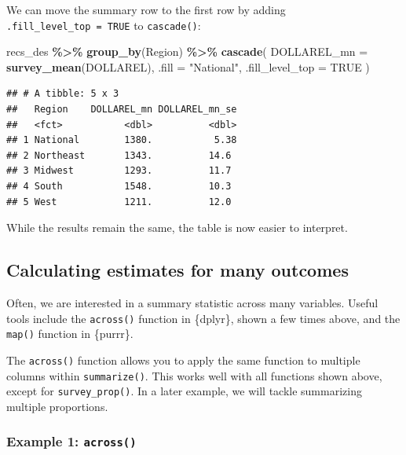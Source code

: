 \documentclass[
]{krantz}
\makeatletter
\newenvironment{Shaded}{\begin{snugshade}}{\end{snugshade}}
\newcommand{\AttributeTok}[1]{\textcolor[rgb]{0.27,0.27,0.27}{#1}}
\newcommand{\ConstantTok}[1]{\textcolor[rgb]{0.37,0.37,0.37}{#1}}
\newcommand{\FunctionTok}[1]{\textcolor[rgb]{0.27,0.27,0.27}{\textbf{#1}}}
\newcommand{\NormalTok}[1]{#1}
\newcommand{\SpecialCharTok}[1]{\textcolor[rgb]{0.43,0.43,0.43}{\textbf{#1}}}
\newcommand{\StringTok}[1]{\textcolor[rgb]{0.5,0.5,0.5}{#1}}
\newenvironment{kframe}{%
\medskip{}
\setlength{\fboxsep}{.8em}
 \def\at@end@of@kframe{}%
 \ifinner\ifhmode%
  \def\at@end@of@kframe{\end{minipage}}%
  \begin{minipage}{\columnwidth}%
 \fi\fi%
 \def\FrameCommand##1{\hskip\@totalleftmargin \hskip-\fboxsep
 \colorbox{shadecolor}{##1}\hskip-\fboxsep
     \hskip-\linewidth \hskip-\@totalleftmargin \hskip\columnwidth}%
 \MakeFramed {\advance\hsize-\width
   \@totalleftmargin\z@ \linewidth\hsize
   \@setminipage}}%
 {\par\unskip\endMakeFramed%
 \at@end@of@kframe}
\renewenvironment{Shaded}{\begin{kframe}}{\end{kframe}}
\makeatother
\begin{document}
We can move the summary row to the first row by adding \texttt{.fill\_level\_top\ =\ TRUE} to \texttt{cascade()}:

\begin{Shaded}
\begin{Highlighting}[]
\NormalTok{recs\_des }\SpecialCharTok{\%\textgreater{}\%}
  \FunctionTok{group\_by}\NormalTok{(Region) }\SpecialCharTok{\%\textgreater{}\%}
  \FunctionTok{cascade}\NormalTok{(}
    \AttributeTok{DOLLAREL\_mn =} \FunctionTok{survey\_mean}\NormalTok{(DOLLAREL),}
    \AttributeTok{.fill =} \StringTok{"National"}\NormalTok{,}
    \AttributeTok{.fill\_level\_top =} \ConstantTok{TRUE}
\NormalTok{  )}
\end{Highlighting}
\end{Shaded}

\begin{verbatim}
## # A tibble: 5 x 3
##   Region    DOLLAREL_mn DOLLAREL_mn_se
##   <fct>           <dbl>          <dbl>
## 1 National        1380.           5.38
## 2 Northeast       1343.          14.6 
## 3 Midwest         1293.          11.7 
## 4 South           1548.          10.3 
## 5 West            1211.          12.0
\end{verbatim}

While the results remain the same, the table is now easier to interpret.

\hypertarget{calculating-estimates-for-many-outcomes}{%
\subsection{Calculating estimates for many outcomes}\label{calculating-estimates-for-many-outcomes}}

Often, we are interested in a summary statistic across many variables. Useful tools include the \texttt{across()} function in \{dplyr\}, shown a few times above, and the \texttt{map()} function in \{purrr\}.

The \texttt{across()} function allows you to apply the same function to multiple columns within \texttt{summarize()}. This works well with all functions shown above, except for \texttt{survey\_prop()}. In a later example, we will tackle summarizing multiple proportions.

\hypertarget{example-1-across}{%
\subsubsection*{\texorpdfstring{Example 1: \texttt{across()}}{Example 1: across()}}\label{example-1-across}}
\end{document}
